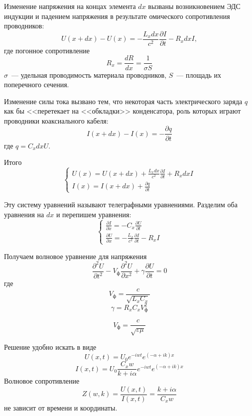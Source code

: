  Изменение напряжения на концах элемента $dx$ вызваны возникновением ЭДС индукции и
 падением напряжения в результате омического сопротивления проводников:
 \[
     U(x+dx) - U(x) = -\frac{L_{x}dx}{c^{2}}\frac{\partial I}{\partial t} - R_{x}dxI,
 \]
где  погонное сопротивление
\[
    R_{x} = \frac{dR}{dx} = \frac{1}{ \sigma S}
\]
$ \sigma$~--- удельная проводимость материала проводников, $S$~--- площадь их поперечного сечения.

Изменение силы тока вызвано тем, что некоторая часть электрического заряда $q$ как бы
<<перетекает на <<обкладки>>  конденсатора, роль которых играют проводники коаксиального кабеля:
\[
    I(x+dx) - I(x) = -\frac{\partial q}{\partial t }
\]
где $q=C_{x} dx U$.

Итого
\begin{equation}
    \begin{cases}
        U(x) = U(x+dx) + \frac{L_{x}dx}{c^{2}}\frac{\partial I}{\partial t} + R_{x}dxI\\
        I(x) = I(x+dx) + \frac{\partial q}{\partial t}  
    \end{cases}
\end{equation}

Эту систему уравнений называют телеграфными уравнениями. Разделим оба уравнения на $dx$
и перепишем уравнения:
\begin{equation}
\begin{cases}
    \frac{\partial I}{\partial x} = -C_{x} \frac{\partial U}{\partial t} \\
    \frac{\partial U}{\partial x} = -\frac{L_{x}}{c^{2}}\frac{\partial I}{\partial t} - R_{x}I 
\end{cases}
\end{equation}

Получаем волновое уравнение для напряжения
\[
    \frac{\partial^{2}U}{\partial t^{2}} - V_{\text{ф}}\frac{\partial^{2}U}{\partial x^{2}} + \gamma \frac{\partial U}{\partial t} = 0
\]
где
\[
    V_{\text{ф}} = \frac{c}{\sqrt{L_{x}C_{x}}}
\]
\[
    \gamma = R_{x}C_{x}V_{\text{ф}}^{2}
\]

\[
    V_{\text{ф}} = \frac{c}{\sqrt{ \varepsilon \mu}}
\]

Решение удобно искать в виде
\[
    U(x, t) = U_{0} e^{-iwt}e^{\left(- \alpha + ik\right)x}
\]
\[
    I(x, t) = U_{0} \frac{C_{x}w}{k+i \alpha}e^{-iwt}e^{\left(- \alpha + ik\right)x}
\]
Волновое сопротивление
\[
    Z(w, k) = \frac{U(x, t)}{I(x, t)} = \frac{k+i \alpha}{C_{x}w}
\]
не зависит от времени и координаты.


